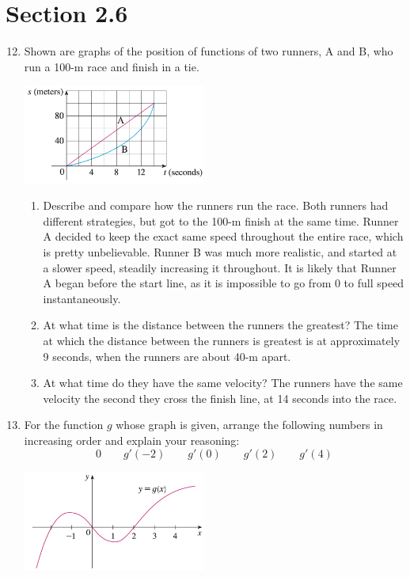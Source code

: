 \documentclass{article}
\begin{document}
\section{Section 2.6}
\begin{enumerate}
\setcounter{enumi}{11}
	\item Shown are graphs of the position of functions of two runners, A and B, who run a 100-m race and finish in a tie. \begin{center}\includegraphics[width=6cm]{images/26pr12}\end{center}
	\begin{enumerate}
		\item Describe and compare how the runners run the race. \newline
			Both runners had different strategies, but got to the 100-m finish at the same time. Runner A decided to keep the exact same speed throughout the entire race, which is pretty unbelievable. Runner B was much more realistic, and started at a slower speed, steadily increasing it throughout. It is likely that Runner A began before the start line, as it is impossible to go from 0 to full speed instantaneously.
		\item At what time is the distance between the runners the greatest?\newline
			The time at which the distance between the runners is greatest is at approximately 9 seconds, when the runners are about 40-m apart.
		\item At what time do they have the same velocity?\newline
			The runners have the same velocity the second they cross the finish line, at 14 seconds into the race.
	\end{enumerate}
\setcounter{enumi}{16}
	\item For the function $g$ whose graph is given, arrange the following numbers in increasing order and explain your reasoning: $$0 \qquad g'(-2) \qquad g'(0) \qquad g'(2) \qquad g'(4)$$
	\begin{center}\includegraphics[width=6cm]{images/26pr17}\end{center}

\end{enumerate}
\end{document}
